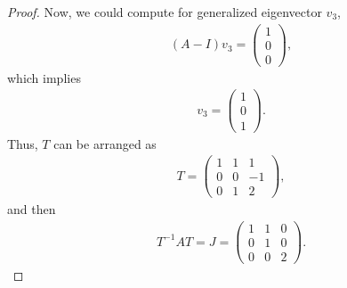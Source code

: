 \documentclass[10pt]{book}
\theoremstyle{definition}
\numberwithin{equation}{chapter}
\begin{document}
\begin{proof}
Now, we could compute for generalized eigenvector $v_3$,
\begin{align*}
    (A - I)v_3 = \begin{pmatrix}
        1 \\
        0 \\
        0
    \end{pmatrix},
\end{align*}
which implies 
\begin{align*}
    v_3 = \begin{pmatrix}
        1 \\
        0 \\
        1
    \end{pmatrix}.
\end{align*}
Thus, $T$ can be arranged as
\begin{align*}
    T = \begin{pmatrix}
        1 & 1 & 1 \\
        0 & 0 & -1 \\
        0 & 1 & 2
    \end{pmatrix},
\end{align*}
and then
\begin{align*}
    T^{-1} A T = J = \begin{pmatrix}
        1 & 1 & 0 \\
        0 & 1 & 0 \\
        0 & 0 & 2
    \end{pmatrix}.
\end{align*}
\end{proof}

\medskip
\end{document}
